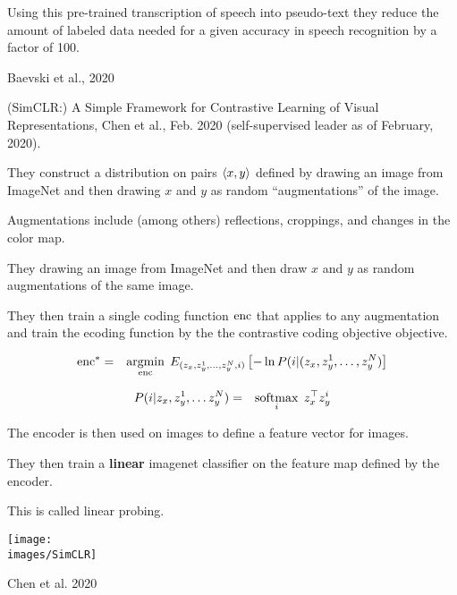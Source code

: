 {\vfill
Using this pre-trained transcription of speech into pseudo-text they reduce the amount of labeled data needed for a given accuracy in speech recognition by a factor of 100.

\vfill
\centerline{\huge Baevski et al., 2020}


(SimCLR:) A Simple Framework for Contrastive Learning of Visual Representations, Chen et al., Feb. 2020 (self-supervised leader as of February, 2020).

\vfill
They construct a distribution on pairs ${\mbox{$\langle x,y\rangle$}}$ defined by drawing an image from ImageNet and then drawing $x$ and $y$ as random ``augmentations'' of the image.

\vfill
Augmentations include (among others) reflections, croppings, and changes in the color map.


\vfill
They drawing an image from ImageNet and then draw $x$ and $y$ as random augmentations
of the same image.

\vfill
They then train a single coding function $\mathrm{enc}$ that applies to any augmentation and train the ecoding function by the
the contrastive coding objective objective.

\begin{eqnarray*}
\mathrm{enc}^* & = & \operatorname*{argmin}_{\mathrm{enc}} \;E_{(z_x,z_y^1,\ldots,z_y^N,i)}\left[-\ln P(i|(z_x,z_y^1,\ldots,z_y^N)\right]
\end{eqnarray*}

\begin{eqnarray*}
P(i|z_x,z_y^1,\ldots z_y^N) & = & \operatorname*{softmax}_i\; z_x^\top z_y^i
\end{eqnarray*}



The encoder is then used on images to define a feature vector for images.

\vfill
They then train a {\bf linear} imagenet classifier on the feature map defined by the encoder.

\vfill
This is called linear probing.


\centerline{\texttt{[image: \\images/SimCLR]}}

\vfill
\centerline{\huge Chen et al. 2020}

}
